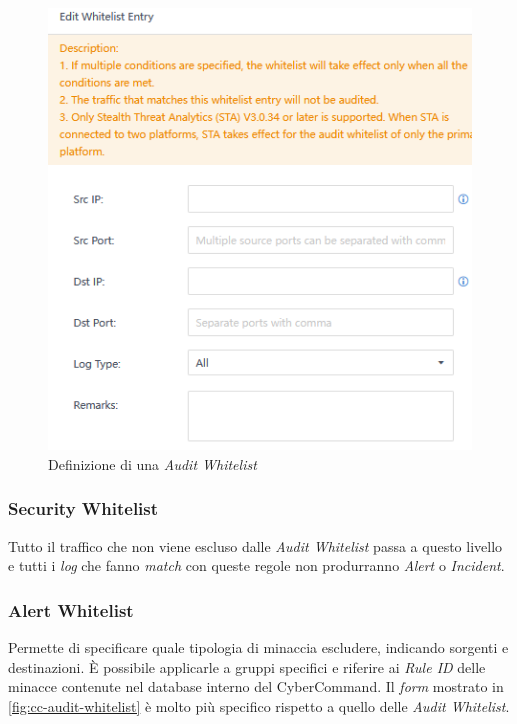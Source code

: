 \begin{figure}[!htbp]
    \centering
    \includegraphics[scale=0.8]{images/ndr/audit-whitelist.png}
    \caption{Definizione di una \emph{Audit Whitelist}}
    \label{fig:cc-audit-whitelist}
\end{figure}

\subsubsection{Security Whitelist}

Tutto il traffico che non viene escluso dalle \emph{Audit Whitelist} passa a questo livello e tutti i \emph{log} che fanno \emph{match} con queste regole non produrranno \emph{Alert} o \emph{Incident}.

\subsubsection{Alert Whitelist}

Permette di specificare quale tipologia di minaccia escludere, indicando sorgenti e destinazioni. È possibile applicarle a gruppi specifici e riferire ai \emph{Rule ID} delle minacce contenute nel database interno del CyberCommand. Il \emph{form} mostrato in \autoref{fig:cc-audit-whitelist} è molto più specifico rispetto a quello delle \emph{Audit Whitelist}.

